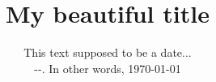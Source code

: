 \documentclass{article}
\title{My beautiful title}
\date{This text supposed to be a date...\\ \the\year -\the\month -\the\day. In other words, \today}
\begin{document}
\maketitle{}
\end{document}
